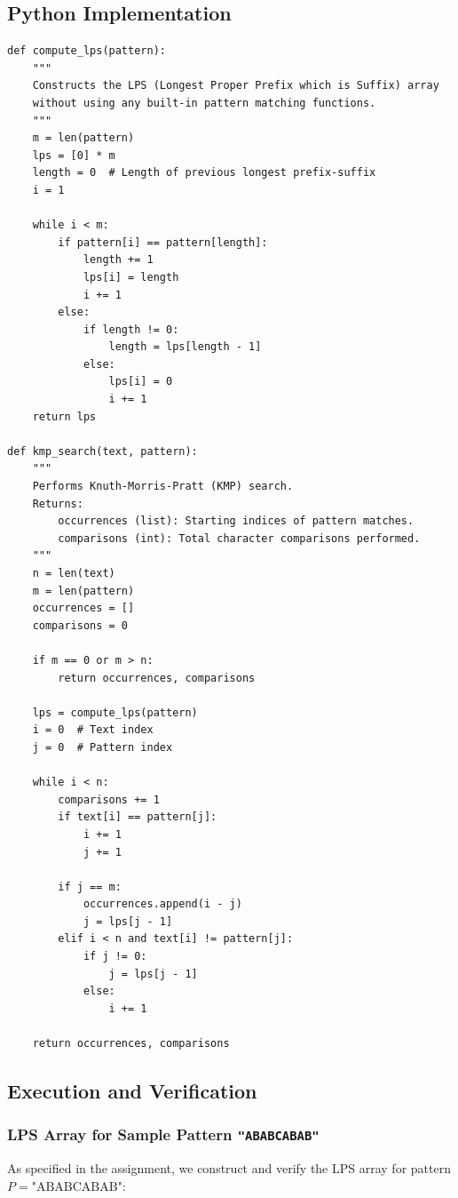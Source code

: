 \documentclass[12pt]{article}
\begin{document}
\subsection{Python Implementation}
\begin{lstlisting}[style=code, caption={LPS Array Computation and KMP Search}]
def compute_lps(pattern):
    """
    Constructs the LPS (Longest Proper Prefix which is Suffix) array
    without using any built-in pattern matching functions.
    """
    m = len(pattern)
    lps = [0] * m
    length = 0  # Length of previous longest prefix-suffix
    i = 1

    while i < m:
        if pattern[i] == pattern[length]:
            length += 1
            lps[i] = length
            i += 1
        else:
            if length != 0:
                length = lps[length - 1]
            else:
                lps[i] = 0
                i += 1
    return lps

def kmp_search(text, pattern):
    """
    Performs Knuth-Morris-Pratt (KMP) search.
    Returns:
        occurrences (list): Starting indices of pattern matches.
        comparisons (int): Total character comparisons performed.
    """
    n = len(text)
    m = len(pattern)
    occurrences = []
    comparisons = 0

    if m == 0 or m > n:
        return occurrences, comparisons

    lps = compute_lps(pattern)
    i = 0  # Text index
    j = 0  # Pattern index

    while i < n:
        comparisons += 1
        if text[i] == pattern[j]:
            i += 1
            j += 1

        if j == m:
            occurrences.append(i - j)
            j = lps[j - 1]
        elif i < n and text[i] != pattern[j]:
            if j != 0:
                j = lps[j - 1]
            else:
                i += 1

    return occurrences, comparisons
\end{lstlisting}

\subsection{Execution and Verification}
\subsubsection{LPS Array for Sample Pattern \texttt{"ABABCABAB"}}
As specified in the assignment, we construct and verify the LPS array for pattern $P = \text{"ABABCABAB"}$:
\end{document}
